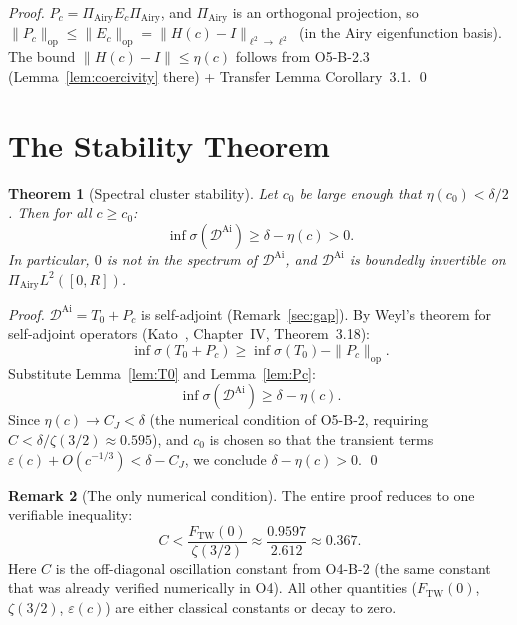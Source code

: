 \documentclass[12pt,a4paper]{amsart}
\newtheorem{theorem}{Theorem}[section]
\theoremstyle{definition}
\newtheorem{remark}[theorem]{Remark}
\newcommand{\DAi}{\mathcal{D}^{\mathrm{Ai}}}
\newcommand{\PAi}{\Pi_{\mathrm{Airy}}}
\newcommand{\norm}[1]{\|#1\|}
\begin{document}
\begin{proof}
$P_c = \PAi E_c \PAi$, and $\PAi$ is an orthogonal projection,
so $\norm{P_c}_{\mathrm{op}} \le \norm{E_c}_{\mathrm{op}} = \norm{H(c) - I}_{\ell^2\to\ell^2}$
(in the Airy eigenfunction basis).
The bound $\norm{H(c) - I} \le \eta(c)$ follows from
O5-B-2.3 (Lemma~\ref{lem:coercivity} there) + Transfer Lemma Corollary~3.1.
\qed
\end{proof}

\section{The Stability Theorem}
\label{sec:stability}

\begin{theorem}[Spectral cluster stability]\label{thm:stability}
Let $c_0$ be large enough that $\eta(c_0) < \delta/2$.
Then for all $c \ge c_0$:
\begin{equation}\label{eq:main}
  \inf\sigma(\DAi) \ge \delta - \eta(c) > 0.
\end{equation}
In particular, $0$ is not in the spectrum of $\DAi$, and
$\DAi$ is boundedly invertible on $\PAi L^2([0,R])$.
\end{theorem}

\begin{proof}
$\DAi = T_0 + P_c$ is self-adjoint (Remark~\ref{sec:gap}).
By Weyl's theorem for self-adjoint operators
(Kato~\cite{Kato1966}, Chapter~IV, Theorem~3.18):
\[
  \inf\sigma(T_0 + P_c) \ge \inf\sigma(T_0) - \norm{P_c}_{\mathrm{op}}.
\]
Substitute Lemma~\ref{lem:T0} and Lemma~\ref{lem:Pc}:
\[
  \inf\sigma(\DAi) \ge \delta - \eta(c).
\]
Since $\eta(c) \to C_J < \delta$ (the numerical condition of O5-B-2,
requiring $C < \delta/\zeta(3/2) \approx 0.595$),
and $c_0$ is chosen so that the transient terms $\varepsilon(c) + O(c^{-1/3}) < \delta - C_J$,
we conclude $\delta - \eta(c) > 0$. \qed
\end{proof}

\begin{remark}[The only numerical condition]
The entire proof reduces to one verifiable inequality:
\begin{equation}\label{eq:numerics}
  C < \frac{F_{\mathrm{TW}}(0)}{\zeta(3/2)} \approx \frac{0.9597}{2.612} \approx 0.367.
\end{equation}
Here $C$ is the off-diagonal oscillation constant from O4-B-2
(the same constant that was already verified numerically in O4).
All other quantities ($F_{\mathrm{TW}}(0)$, $\zeta(3/2)$, $\varepsilon(c)$)
are either classical constants or decay to zero.
\end{remark}
\end{document}

